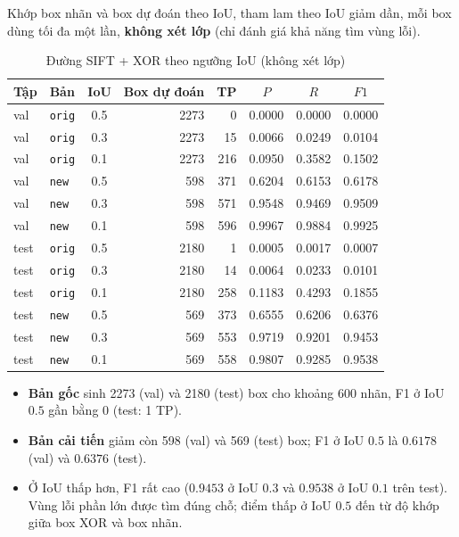 \documentclass[11pt,a4paper]{article}
\begin{document}
Khớp box nhãn và box dự đoán theo IoU, tham lam theo IoU giảm dần, mỗi box dùng tối đa một lần, \textbf{không xét lớp} (chỉ đánh giá khả năng tìm vùng lỗi).
\begin{table}[H]
\centering
\small
\caption{Đường SIFT + XOR theo ngưỡng IoU (không xét lớp)}\label{tab:xoriou}
\begin{tabular}{l|l|c|rr|ccc}
\toprule
\textbf{Tập} & \textbf{Bản} & \textbf{IoU} & \textbf{Box dự đoán} & \textbf{TP} & $P$ & $R$ & $F1$ \\ \midrule
val & \texttt{orig} & 0.5 & 2273 & 0 & 0.0000 & 0.0000 & 0.0000 \\
val & \texttt{orig} & 0.3 & 2273 & 15 & 0.0066 & 0.0249 & 0.0104 \\
val & \texttt{orig} & 0.1 & 2273 & 216 & 0.0950 & 0.3582 & 0.1502 \\
val & \texttt{new} & 0.5 & 598 & 371 & 0.6204 & 0.6153 & 0.6178 \\
val & \texttt{new} & 0.3 & 598 & 571 & 0.9548 & 0.9469 & 0.9509 \\
val & \texttt{new} & 0.1 & 598 & 596 & 0.9967 & 0.9884 & 0.9925 \\ \midrule
test & \texttt{orig} & 0.5 & 2180 & 1 & 0.0005 & 0.0017 & 0.0007 \\
test & \texttt{orig} & 0.3 & 2180 & 14 & 0.0064 & 0.0233 & 0.0101 \\
test & \texttt{orig} & 0.1 & 2180 & 258 & 0.1183 & 0.4293 & 0.1855 \\
test & \texttt{new} & 0.5 & 569 & 373 & 0.6555 & 0.6206 & 0.6376 \\
test & \texttt{new} & 0.3 & 569 & 553 & 0.9719 & 0.9201 & 0.9453 \\
test & \texttt{new} & 0.1 & 569 & 558 & 0.9807 & 0.9285 & 0.9538 \\ \bottomrule
\end{tabular}
\end{table}
\begin{itemize}
  \item \textbf{Bản gốc} sinh 2273 (val) và 2180 (test) box cho khoảng 600 nhãn, F1 ở IoU $0.5$ gần bằng 0 (test: 1 TP).
  \item \textbf{Bản cải tiến} giảm còn 598 (val) và 569 (test) box; F1 ở IoU $0.5$ là $0.6178$ (val) và $0.6376$ (test).
  \item Ở IoU thấp hơn, F1 rất cao ($0.9453$ ở IoU $0.3$ và $0.9538$ ở IoU $0.1$ trên test). Vùng lỗi phần lớn được tìm đúng chỗ; điểm thấp ở IoU $0.5$ đến từ độ khớp giữa box XOR và box nhãn.
\end{itemize}
\end{document}

